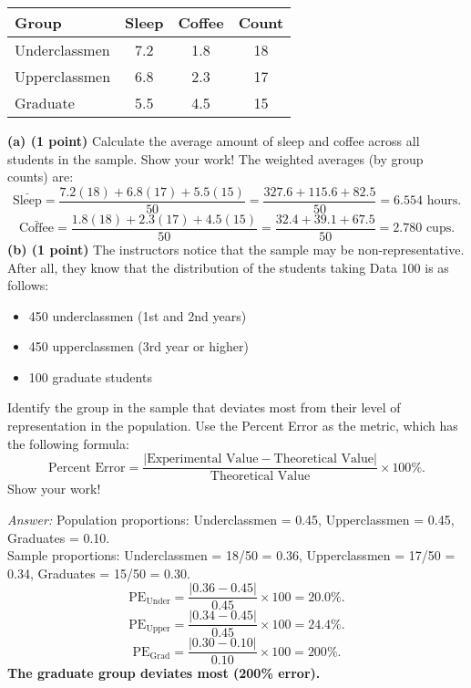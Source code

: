 \documentclass[11pt]{article}
\begin{document}
\begin{center}
\begin{tabular}{lccc}
\toprule
\textbf{Group} & \textbf{Sleep} & \textbf{Coffee} & \textbf{Count}\\
\midrule
Underclassmen & 7.2 & 1.8 & 18\\
Upperclassmen & 6.8 & 2.3 & 17\\
Graduate & 5.5 & 4.5 & 15\\
\bottomrule
\end{tabular}
\end{center}

\noindent \textbf{(a) (1 point)} Calculate the average amount of sleep and coffee across all students in the sample. Show your work!
\medskip
\noindent
The weighted averages (by group counts) are:
\[
\bar{\text{Sleep}} = 
\frac{7.2(18) + 6.8(17) + 5.5(15)}{50}
= \frac{327.6 + 115.6 + 82.5}{50}
= 6.554\text{ hours.}
\]
\[
\bar{\text{Coffee}} = 
\frac{1.8(18) + 2.3(17) + 4.5(15)}{50}
= \frac{32.4 + 39.1 + 67.5}{50}
= 2.780\text{ cups.}
\]
\medskip
\noindent \textbf{(b) (1 point)} The instructors notice that the sample may be non-representative. After all, they know that the distribution of the students taking Data 100 is as follows:
\begin{itemize} [leftmargin=4em]
    \item 450 underclassmen (1st and 2nd years)
    \item 450 upperclassmen (3rd year or higher)
    \item 100 graduate students
\end{itemize}
Identify the group in the sample that deviates most from their level of representation in the population. Use the Percent Error as the metric, which has the following formula:
\[
\text{Percent Error}=\frac{|\text{Experimental Value}-\text{Theoretical Value}|}{\text{Theoretical Value}}\times 100\%.
\]
Show your work!

\medskip
\noindent

\noindent \textit{Answer:} Population proportions: Underclassmen = 0.45, Upperclassmen = 0.45, Graduates = 0.10. \\
Sample proportions: Underclassmen = 18/50 = 0.36, Upperclassmen = 17/50 = 0.34, Graduates = 15/50 = 0.30.
\[
\text{PE}_{\text{Under}} = \frac{|0.36-0.45|}{0.45}\times100 = 20.0\%.
\]
\[
\text{PE}_{\text{Upper}} = \frac{|0.34-0.45|}{0.45}\times100 = 24.4\%.
\]
\[
\text{PE}_{\text{Grad}} = \frac{|0.30-0.10|}{0.10}\times100 = 200\%.
\]
\noindent
\textbf{The graduate group deviates most (200\% error).}
\end{document}
